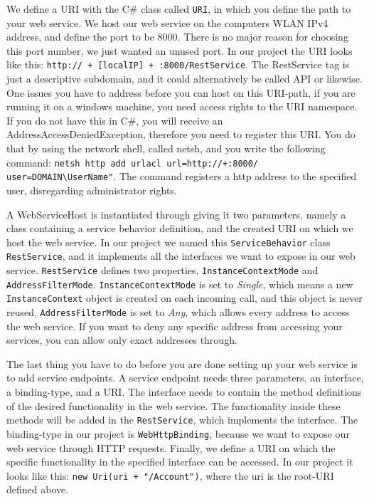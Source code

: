 We define a URI with the C\# class called \texttt{URI}\cite{URIclass}, in which you define the path to your web service. We host our web service on the computers WLAN IPv4 address, and define the port to be 8000. There is no major reason for choosing this port number, we just wanted an unused port. In our project the URI looks like this: \texttt{http:// + [localIP] + :8000/RestService}. The RestService tag is just a descriptive subdomain, and it could alternatively be called API or likewise. One issues you have to address before you can host on this URI-path, if you are running it on a windows machine, you need access rights to the URI namespace. If you do not have this in C\#, you will receive an AddressAccessDeniedException, therefore you need to register this URI. You do that by using the network shell, called netsh, and you write the following command: \texttt{netsh http add urlacl url=http://+:8000/ user=DOMAIN\textbackslash UserName"}. The command registers a http address to the specified user, disregarding administrator rights\cite{netshURI}.

A WebServiceHost is instantiated through giving it two parameters, namely a class containing a service behavior definition, and the created URI on which we host the web service. In our project we named this \texttt{ServiceBehavior}\cite{ServiceBehavior} class \texttt{RestService}, and it implements all the interfaces we want to expose in our web service. \texttt{RestService} defines two properties, \texttt{InstanceContextMode}\cite{InstanceCtxMode} and \texttt{AddressFilterMode}\cite{AddressFilterMode}. \texttt{InstanceContextMode} is set to \textit{Single}, which means a new \texttt{InstanceContext} object is created on each incoming call, and this object is never reused. \texttt{AddressFilterMode} is set to \textit{Any}, which allows every address to access the web service. If you want to deny any specific address from accessing your services, you can allow only exact addresses through. 

The last thing you have to do before you are done setting up your web service is to add service endpoints. A service endpoint needs three parameters, an interface, a binding-type, and a URI. The interface needs to contain the method definitions of the desired functionality in the web service. The functionality inside these methods will be added in the \texttt{RestService}, which implements the interface. The binding-type in our project is \texttt{WebHttpBinding}\cite{WebHttpBinding}, because we want to expose our web service through HTTP requests. Finally, we define a URI on which the specific functionality in the specified interface can be accessed. In our project it looks like this: \texttt{new Uri(uri + "/Account")}, where the uri is the root-URI defined above.

